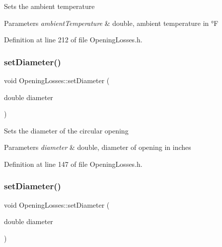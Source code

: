 Sets the ambient temperature 
\begin{DoxyParams}{Parameters}
{\em ambient\+Temperature} & double, ambient temperature in °F \\
\hline
\end{DoxyParams}


Definition at line 212 of file Opening\+Losses.\+h.

\mbox{\label{class_opening_losses_ab840ba51788e83c0b1dc9b8c05b1eadb}} 
\subsubsection{\texorpdfstring{set\+Diameter()}{setDiameter()}\hspace{0.1cm}{\footnotesize\ttfamily [1/3]}}
{\footnotesize\ttfamily void Opening\+Losses\+::set\+Diameter (\begin{DoxyParamCaption}\item[{double}]{diameter }\end{DoxyParamCaption})\hspace{0.3cm}{\ttfamily [inline]}}

Sets the diameter of the circular opening 
\begin{DoxyParams}{Parameters}
{\em diameter} & double, diameter of opening in inches \\
\hline
\end{DoxyParams}


Definition at line 147 of file Opening\+Losses.\+h.

\mbox{\label{class_opening_losses_ab840ba51788e83c0b1dc9b8c05b1eadb}} 
\subsubsection{\texorpdfstring{set\+Diameter()}{setDiameter()}\hspace{0.1cm}{\footnotesize\ttfamily [2/3]}}
{\footnotesize\ttfamily void Opening\+Losses\+::set\+Diameter (\begin{DoxyParamCaption}\item[{double}]{diameter }\end{DoxyParamCaption})\hspace{0.3cm}{\ttfamily [inline]}}

